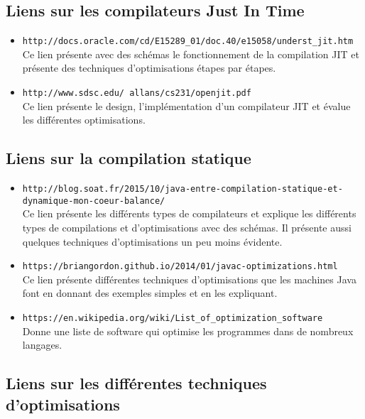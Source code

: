 \documentclass[a4paper]{article}
\begin{document}
\subsection{Liens sur les compilateurs Just In Time}
\begin{itemize}
\item \texttt{http://docs.oracle.com/cd/E15289\_01/doc.40/e15058/underst\_jit.htm} \\
Ce lien présente avec des schémas le fonctionnement de la compilation JIT et présente des techniques d'optimisations étapes par étapes.\\

\item \texttt{http://www.sdsc.edu/~allans/cs231/openjit.pdf} \\
Ce lien présente le design, l'implémentation d'un compilateur JIT et évalue les différentes optimisations.\\
     \end{itemize}

\subsection{Liens sur la compilation statique}
\begin{itemize}
\item \texttt{http://blog.soat.fr/2015/10/java-entre-compilation-statique-et-dynamique-mon-coeur-balance/} \\
Ce lien présente les différents types de compilateurs et explique les différents types de compilations et d'optimisations avec des schémas. Il présente aussi quelques techniques d'optimisations un peu moins évidente.\\

\item \texttt{https://briangordon.github.io/2014/01/javac-optimizations.html} \\
Ce lien présente différentes techniques d'optimisations que les machines Java font en donnant des exemples simples et en les expliquant.\\

\item \texttt{https://en.wikipedia.org/wiki/List\_of\_optimization\_software} \\
Donne une liste de software qui optimise les programmes dans de nombreux langages.\\
     \end{itemize}

\subsection{Liens sur les différentes techniques d'optimisations}
\end{document}
